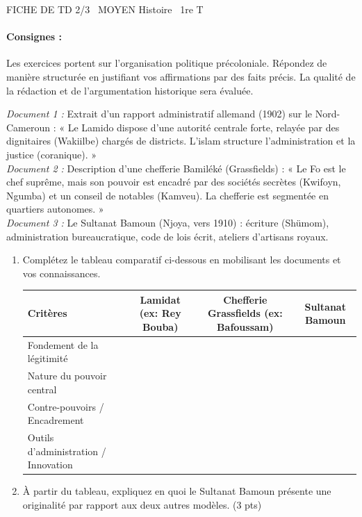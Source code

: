 \documentclass[11pt]{article}
\begin{document}
\begin{tcolorbox}[enhanced,colback=popink,colframe=popink,arc=10pt,boxrule=0pt,left=12pt,right=12pt,top=9pt,bottom=9pt]
{\color{white}\popxbold\small FICHE DE TD 2/3 \textbullet\ MOYEN \hfill Histoire \textbullet\ 1re T\par}
\end{tcolorbox}
\vspace{4pt}
\paragraph{Consignes :} Les exercices portent sur l'organisation politique précoloniale. Répondez de manière structurée en justifiant vos affirmations par des faits précis. La qualité de la rédaction et de l'argumentation historique sera évaluée.

\begin{exercice}
\emph{Document 1 :} Extrait d'un rapport administratif allemand (1902) sur le Nord-Cameroun : « Le Lamido dispose d'une autorité centrale forte, relayée par des dignitaires (Wakiilbe) chargés de districts. L'islam structure l'administration et la justice (coranique). »\\
\emph{Document 2 :} Description d'une chefferie Bamiléké (Grassfields) : « Le Fo est le chef suprême, mais son pouvoir est encadré par des sociétés secrètes (Kwifoyn, Ngumba) et un conseil de notables (Kamveu). La chefferie est segmentée en quartiers autonomes. »\\
\emph{Document 3 :} Le Sultanat Bamoun (Njoya, vers 1910) : écriture (Shümom), administration bureaucratique, code de lois écrit, ateliers d'artisans royaux.
\begin{enumerate}
    \item Complétez le tableau comparatif ci-dessous en mobilisant les documents et vos connaissances.
    \begin{tabular}{|l|c|c|c|}
    \hline
    \textbf{Critères} & \textbf{Lamidat (ex: Rey Bouba)} & \textbf{Chefferie Grassfields (ex: Bafoussam)} & \textbf{Sultanat Bamoun} \\
    \hline
    Fondement de la légitimité & & & \\
    \hline
    Nature du pouvoir central & & & \\
    \hline
    Contre-pouvoirs / Encadrement & & & \\
    \hline
    Outils d'administration / Innovation & & & \\
    \hline
    \end{tabular}
    \item À partir du tableau, expliquez en quoi le Sultanat Bamoun présente une originalité par rapport aux deux autres modèles. (3 pts)
\end{enumerate}
\end{exercice}
\end{document}
